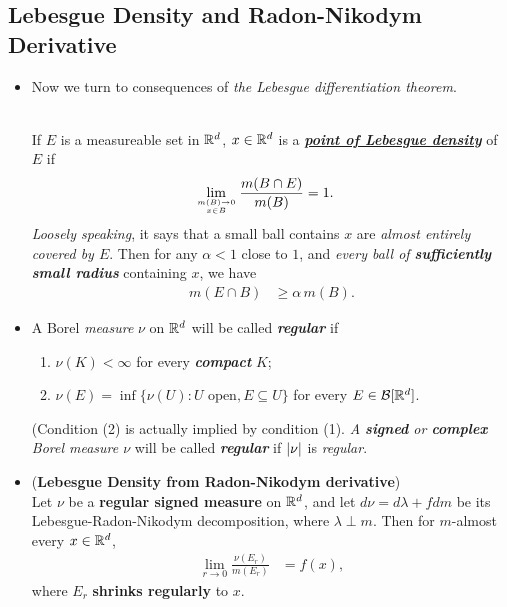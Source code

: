 \documentclass[11pt]{article}
\begin{document}
\subsection{Lebesgue Density and Radon-Nikodym Derivative}
\begin{itemize}
\item Now we turn to consequences of \emph{the Lebesgue differentiation theorem}. 
\begin{definition}\citep{stein2009real}\\
If $E$ is a measureable set in ${\mathbb R}^{d}$, $x\in {\mathbb R}^{d}$ is a \underline{\emph{\textbf{point of Lebesgue density}}} of $E$ if
\begin{align*}
\lim\limits_{m(B)\rightarrow 0 \atop x\in B}\frac{m(B\cap E)}{m(B)} &= 1.
\end{align*} 
\emph{Loosely speaking}, it says that a small ball contains $x$ are \emph{almost entirely covered by $E$}. Then for any $\alpha<1$ close to $1$, and \emph{every ball of \textbf{sufficiently small radius}} containing $x$, we have
\begin{align*}
m(E\cap B) &\ge \alpha\, m(B).
\end{align*}
\end{definition}

\item \begin{definition} 
A Borel \emph{measure} $\nu$ on ${\mathbb R}^d$ will be called \emph{\textbf{regular}} if
\begin{enumerate}
\item $\nu(K) < \infty$ for every \emph{\textbf{compact}} $K$;
\item $\nu(E) = \inf\{\nu(U): U\text{ open}, E \subseteq U\}$ for every $E \in {\mathcal B}[{\mathbb R}^{d}]$.
\end{enumerate}
(Condition (2) is actually implied by condition (1). \emph{A \textbf{signed} or \textbf{complex} Borel measure $\nu$} will be called \emph{\textbf{regular}} if $\left\lvert \nu \right\rvert$ is \emph{regular}.
\end{definition}

\item \begin{theorem}(\textbf{Lebesgue Density from Radon-Nikodym derivative}) \citep{folland2013real}\\
Let $\nu$ be a \textbf{regular signed measure} on ${\mathbb R}^{d}$, and let $d\nu = d\lambda+ fdm$ be its Lebesgue-Radon-Nikodym decomposition, where $\lambda \perp m$.  Then for $m$-almost every $x\in {\mathbb R}^{d}$,
\begin{align*}
\lim\limits_{r\rightarrow 0}\frac{\nu(E_{r})}{m(E_{r})} &= f(x),
\end{align*} where $E_{r}$ \textbf{shrinks regularly} to $x$.
\end{theorem}
\end{itemize}
\end{document}
